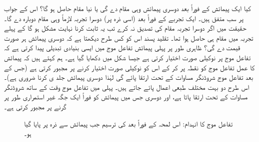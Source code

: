 کیا ایک پیمائش کے فوراً بعد دوسری پیمائش وہی مقام  دے گی یا نیا مقام حاصل ہو گا؟ اس کے جواب پر سب متفق ہیں۔ ایک تجربے کے فوراً  بعد (اسی ذرہ پر) دوسرا تجربہ لازماً وہی مقام دوبارہ دے گا۔  حقیقت میں اگر دوسرا تجربہ مقام  کی تصدیق نہ کرے تب یہ ثابت کرنا نہایت مشکل ہو گا کے پہلے تجربہ میں مقام  ہی حاصل ہوا تھا۔ تقلید پسند اس کو کس طرح دیکھتا ہے کہ دوسری پیمائش ہر صورت  قیمت دے گی؟ ظاہری طور پر پہلی پیمائش تفاعل موج میں  ایسی بنیادی تبدیلی پیدا کرتی ہے کہ تفاعل موج    پر نوکیلی صورت اختیار کرتی ہے  جیسا  شکل     میں دکھایا گیا ہے۔ ہم کہتے ہیں کہ پیمائش کا عمل تفاعل موج کو نقطہ  پر  کر کے اس کو   نوکیلی صورت اختیار کرنے پر مجبور کرتی ہے  (جس کے بعد تفاعل موج شروڈنگر مساوات کے تحت  ارتقا پائے  گی لہٰذا دوسری پیمائش جلد ی کرنا ضروری ہے)۔ اس طرح دو بہت مختلف طبعی اعمال پائے جاتے ہیں۔ پہلی میں  تفاعل موج وقت کے ساتھ شروڈنگر مساوات کے تحت ارتقا پاتا ہے، اور دوسری جس میں  پیمائش  کو فوراً ایک جگہ غیر استمراری طور پر گرنے پر مجبور کرتی ہے۔ 

\begin{figure}
\centering
{}
\caption{
تفاعل موج کا انہدام:  اس لمحہ کے فوراً بعد  کی ترسیم جب پیمائش سے ذرہ   پر  پایا گیا ہو۔
}
\label{شکل_تفاعل_موج_انہدام}
\end{figure}



